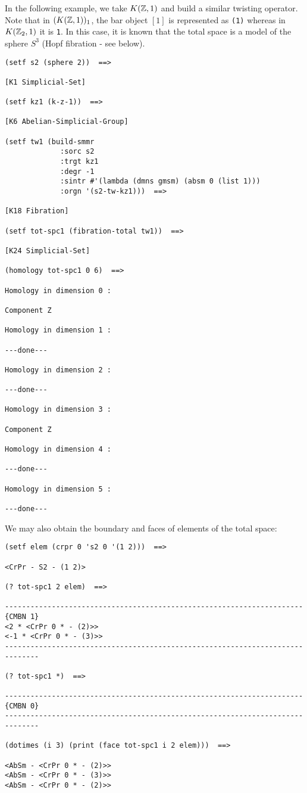 In the following example, we take $K({\mathbb{Z}},1)$ and build a similar twisting o\-pe\-ra\-tor. Note
that in $(K({\mathbb{Z}},1))_1$, the bar object $[1]$ is represented as {\tt (1)} whereas in $K({\mathbb{Z}}_2,1)$ it
is {\tt 1}. In this case, it is known that the total space is a model of the sphere $S^3$
(Hopf fibration - see below).
{\footnotesize\begin{verbatim}
(setf s2 (sphere 2))  ==>

[K1 Simplicial-Set]

(setf kz1 (k-z-1))  ==>

[K6 Abelian-Simplicial-Group]

(setf tw1 (build-smmr
             :sorc s2
             :trgt kz1
             :degr -1
             :sintr #'(lambda (dmns gmsm) (absm 0 (list 1)))
             :orgn '(s2-tw-kz1)))  ==>

[K18 Fibration]

(setf tot-spc1 (fibration-total tw1))  ==>

[K24 Simplicial-Set]

(homology tot-spc1 0 6)  ==>

Homology in dimension 0 :

Component Z

Homology in dimension 1 :

---done---

Homology in dimension 2 :

---done---

Homology in dimension 3 :

Component Z

Homology in dimension 4 :

---done---

Homology in dimension 5 :

---done---
\end{verbatim}}
We may also obtain the boundary and faces of elements of the total space:
{\footnotesize\begin{verbatim}
(setf elem (crpr 0 's2 0 '(1 2)))  ==>

<CrPr - S2 - (1 2)>

(? tot-spc1 2 elem)  ==>

----------------------------------------------------------------------{CMBN 1}
<2 * <CrPr 0 * - (2)>>
<-1 * <CrPr 0 * - (3)>>
------------------------------------------------------------------------------

(? tot-spc1 *)  ==>

----------------------------------------------------------------------{CMBN 0}
------------------------------------------------------------------------------

(dotimes (i 3) (print (face tot-spc1 i 2 elem)))  ==>

<AbSm - <CrPr 0 * - (2)>>
<AbSm - <CrPr 0 * - (3)>>
<AbSm - <CrPr 0 * - (2)>>
\end{verbatim}}
